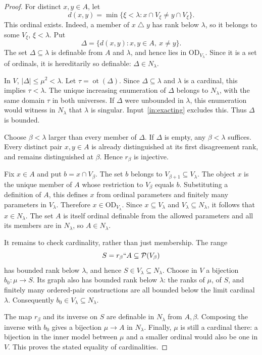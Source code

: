 \documentclass[11pt,letterpaper]{article}
\theoremstyle{definition}
\numberwithin{equation}{section}
\newcommand{\OD}{\mathrm{OD}}
\newcommand{\ot}{\operatorname{ot}}
\newcommand{\Pow}{\mathcal P}
\newcommand{\Nlam}{N_\lambda}
\begin{document}
\begin{proof}
For distinct $x,y\in A$, let
\[
d(x,y)=\min\{\xi<\lambda:x\cap V_\xi\ne y\cap V_\xi\}.
\]
This ordinal exists. Indeed, a member of $x\mathbin\triangle y$ has rank below $\lambda$, so it belongs to some $V_\xi$, $\xi<\lambda$. Put
\[
\Delta=\{d(x,y):x,y\in A,\ x\ne y\}.
\]
The set $\Delta\subseteq\lambda$ is definable from $A$ and $\lambda$, and hence lies in $\OD_{V_\lambda}$. Since it is a set of ordinals, it is hereditarily so definable: $\Delta\in\Nlam$.

In $V$, $|\Delta|\le\mu^2<\lambda$. Let $\tau=\ot(\Delta)$. Since $\Delta\subseteq\lambda$ and $\lambda$ is a cardinal, this implies $\tau<\lambda$. The unique increasing enumeration of $\Delta$ belongs to $\Nlam$, with the same domain $\tau$ in both universes. If $\Delta$ were unbounded in $\lambda$, this enumeration would witness in $\Nlam$ that $\lambda$ is singular. Input~\ref{in:exacting} excludes this. Thus $\Delta$ is bounded.

Choose $\beta<\lambda$ larger than every member of $\Delta$. If $\Delta$ is empty, any $\beta<\lambda$ suffices. Every distinct pair $x,y\in A$ is already distinguished at its first disagreement rank, and remains distinguished at $\beta$. Hence $r_\beta$ is injective.

Fix $x\in A$ and put $b=x\cap V_\beta$. The set $b$ belongs to $V_{\beta+1}\subseteq V_\lambda$. The object $x$ is the unique member of $A$ whose restriction to $V_\beta$ equals $b$. Substituting a definition of $A$, this defines $x$ from ordinal parameters and finitely many parameters in $V_\lambda$. Therefore $x\in\OD_{V_\lambda}$. Since $x\subseteq V_\lambda$ and $V_\lambda\subseteq\Nlam$, it follows that $x\in\Nlam$. The set $A$ is itself ordinal definable from the allowed parameters and all its members are in $\Nlam$, so $A\in\Nlam$.

It remains to check cardinality, rather than just membership. The range
\[
S=r_\beta``A\subseteq\Pow(V_\beta)
\]
has bounded rank below $\lambda$, and hence $S\in V_\lambda\subseteq\Nlam$. Choose in $V$ a bijection $b_0:\mu\to S$. Its graph also has bounded rank below $\lambda$: the ranks of $\mu$, of $S$, and finitely many ordered-pair constructions are all bounded below the limit cardinal $\lambda$. Consequently $b_0\in V_\lambda\subseteq\Nlam$.

The map $r_\beta$ and its inverse on $S$ are definable in $\Nlam$ from $A,\beta$. Composing the inverse with $b_0$ gives a bijection $\mu\to A$ in $\Nlam$. Finally, $\mu$ is still a cardinal there: a bijection in the inner model between $\mu$ and a smaller ordinal would also be one in $V$. This proves the stated equality of cardinalities.
\end{proof}
\end{document}
